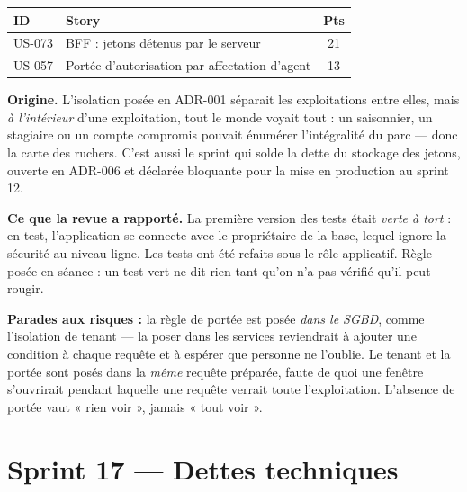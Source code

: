 \begin{center}
\begin{tabular}{lp{9cm}c}
\toprule
\textbf{ID} & \textbf{Story} & \textbf{Pts} \\
\midrule
US-073 & BFF : jetons détenus par le serveur          & 21 \\
US-057 & Portée d'autorisation par affectation d'agent & 13 \\
\bottomrule
\end{tabular}
\end{center}

\textbf{Origine.} L'isolation posée en ADR-001 séparait les exploitations entre
elles, mais \emph{à l'intérieur} d'une exploitation, tout le monde voyait tout :
un saisonnier, un stagiaire ou un compte compromis pouvait énumérer
l'intégralité du parc --- donc la carte des ruchers. C'est aussi le sprint qui
solde la dette du stockage des jetons, ouverte en ADR-006 et déclarée bloquante
pour la mise en production au sprint 12.

\textbf{Ce que la revue a rapporté.} La première version des tests était
\emph{verte à tort} : en test, l'application se connecte avec le propriétaire de
la base, lequel ignore la sécurité au niveau ligne. Les tests ont été refaits
sous le rôle applicatif. Règle posée en séance : un test vert ne dit rien tant
qu'on n'a pas vérifié qu'il peut rougir.

\textbf{Parades aux risques :} la règle de portée est posée \emph{dans le SGBD},
comme l'isolation de tenant --- la poser dans les services reviendrait à ajouter
une condition à chaque requête et à espérer que personne ne l'oublie. Le tenant
et la portée sont posés dans la \emph{même} requête préparée, faute de quoi une
fenêtre s'ouvrirait pendant laquelle une requête verrait toute l'exploitation.
L'absence de portée vaut « rien voir », jamais « tout voir ».

\section{Sprint 17 --- Dettes techniques}

